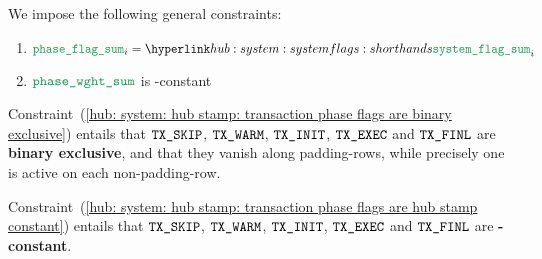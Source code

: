 We impose the following general constraints:
\begin{enumerate}
	\item \label{hub: system: hub stamp: transaction phase flags are binary exclusive}   $\phaseSum _{i} = \flagSum _{i}$
	\item \label{hub: system: hub stamp: transaction phase flags are hub stamp constant} $\weightedPhaseSum$ is \hubStamp{}-constant
\end{enumerate}
\saNote{}
Constraint~(\ref{hub: system: hub stamp: transaction phase flags are binary exclusive})
entails that
$\texttt{TX}\texttt{\_SKIP}$,
$\texttt{TX}\texttt{\_WARM}$,
$\texttt{TX}\texttt{\_INIT}$,
$\texttt{TX}\texttt{\_EXEC}$ and
$\texttt{TX}\texttt{\_FINL}$
are \textbf{binary exclusive}, and that they vanish along padding-rows,
while precisely one is active on each non-padding-row.

\saNote{}
Constraint~(\ref{hub: system: hub stamp: transaction phase flags are hub stamp constant})
entails that
$\texttt{TX}\texttt{\_SKIP}$,
$\texttt{TX}\texttt{\_WARM}$,
$\texttt{TX}\texttt{\_INIT}$,
$\texttt{TX}\texttt{\_EXEC}$ and
$\texttt{TX}\texttt{\_FINL}$
are \textbf{\hubStamp-constant}.

